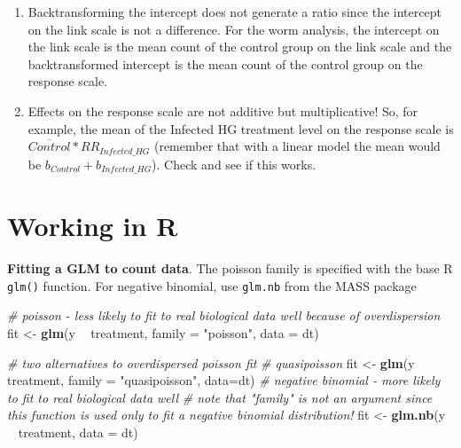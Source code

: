 \documentclass[]{book}
\newenvironment{Shaded}{\begin{snugshade}}{\end{snugshade}}
\newcommand{\CommentTok}[1]{\textcolor[rgb]{0.56,0.35,0.01}{\textit{#1}}}
\newcommand{\DataTypeTok}[1]{\textcolor[rgb]{0.13,0.29,0.53}{#1}}
\newcommand{\KeywordTok}[1]{\textcolor[rgb]{0.13,0.29,0.53}{\textbf{#1}}}
\newcommand{\NormalTok}[1]{#1}
\newcommand{\OperatorTok}[1]{\textcolor[rgb]{0.81,0.36,0.00}{\textbf{#1}}}
\newcommand{\StringTok}[1]{\textcolor[rgb]{0.31,0.60,0.02}{#1}}
\begin{document}
\begin{enumerate}
\def\labelenumi{\arabic{enumi}.}
\setcounter{enumi}{1}
\item
  Backtransforming the intercept does not generate a ratio since the intercept on the link scale is not a difference. For the worm analysis, the intercept on the link scale is the mean count of the control group on the link scale and the backtransformed intercept is the mean count of the control group on the response scale.
\item
  Effects on the response scale are not additive but multiplicative! So, for example, the mean of the Infected HG treatment level on the response scale is \(\overline{Control}*RR_{Infected\_HG}\) (remember that with a linear model the mean would be \(b_{Control} + b_{Infected\_HG}\)). Check and see if this works.
\end{enumerate}

\hypertarget{working-in-r-6}{%
\section{Working in R}\label{working-in-r-6}}

\textbf{Fitting a GLM to count data}. The poisson family is specified with the base R \texttt{glm()} function. For negative binomial, use \texttt{glm.nb} from the MASS package

\begin{Shaded}
\begin{Highlighting}[]
\CommentTok{# poisson - less likely to fit to real biological data well because of overdispersion}
\NormalTok{fit <-}\StringTok{ }\KeywordTok{glm}\NormalTok{(y }\OperatorTok{~}\StringTok{ }\NormalTok{treatment, }\DataTypeTok{family =} \StringTok{"poisson"}\NormalTok{, }\DataTypeTok{data =}\NormalTok{ dt)}

\CommentTok{# two alternatives to overdispersed poisson fit}
\CommentTok{# quasipoisson}
\NormalTok{fit <-}\StringTok{ }\KeywordTok{glm}\NormalTok{(y }\OperatorTok{~}\StringTok{ }\NormalTok{treatment, }\DataTypeTok{family =} \StringTok{"quasipoisson"}\NormalTok{, }\DataTypeTok{data=}\NormalTok{dt)}
\CommentTok{# negative binomial - more likely to fit to real biological data well}
\CommentTok{# note that "family" is not an argument since this function is used only to fit a negative binomial distribution!}
\NormalTok{fit <-}\StringTok{ }\KeywordTok{glm.nb}\NormalTok{(y }\OperatorTok{~}\StringTok{ }\NormalTok{treatment, }\DataTypeTok{data =}\NormalTok{ dt)}
\end{Highlighting}
\end{Shaded}
\end{document}
